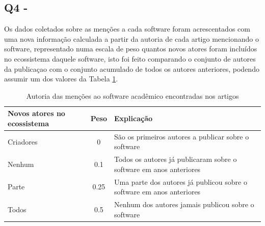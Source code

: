 
\subsection{Q4 - \EstudoDoisQuestaoQuatro}

Os dados coletados sobre as menções a cada software foram acrescentados com uma
nova informação calculada a partir da autoria de cada artigo mencionando o
software, representado numa escala de peso quantos novos atores foram incluídos
no ecossistema daquele software, isto foi feito comparando o conjunto de autores
da publicaçao com o conjunto acumulado de todos os autores anteriores, 
podendo assumir um dos valores da Tabela \ref{coding-scheme-author}.


\begin{table}[h]
\caption{Autoria das menções ao software acadêmico encontradas nos artigos}
\centering
\begin{tabular}{ l c p{10cm} }
  \hline
  Novos atores no ecossistema & Peso & Explicação \\
  \hline
  Criadores & 0 & São os primeiros autores a publicar sobre o software \\
  Nenhum    & 0.1 & Todos os autores já publicaram sobre o software em anos anteriores \\
  Parte     & 0.25 & Uma parte dos autores já publicou sobre o software em anos anteriores \\
  Todos     & 0.5 & Nenhum dos autores jamais publicou sobre o software \\
  \hline
\end{tabular}
\label{coding-scheme-author}
\end{table}

